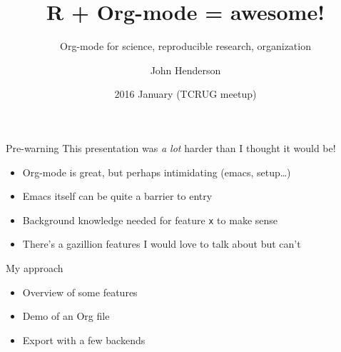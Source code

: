 \documentclass[aspectratio=169,presentation,bigger,fleqn,t]{beamer}
\author{John Henderson}
\date{2016 January (TCRUG meetup)}
\title{R + Org-mode = awesome!}
\subtitle{Org-mode for science, reproducible research, organization}
\begin{document}
\maketitle



\begin{frame}[fragile,label={sec:orgheadline1}]{Pre-warning}
 This presentation was \emph{a lot} harder than I thought it would be!
\begin{itemize}
\item Org-mode is great, but perhaps intimidating (emacs, setup\ldots{})
\item Emacs itself can be quite a barrier to entry
\item Background knowledge needed for feature \texttt{x} to make sense
\item There's a gazillion features I would love to talk about but can't
\end{itemize}
\end{frame}

\begin{frame}[label={sec:orgheadline2}]{My approach}
\begin{itemize}
\item Overview of some features
\item Demo of an Org file
\item Export with a few backends
\end{itemize}
\end{frame}
\end{document}
